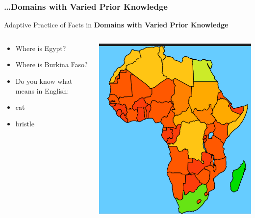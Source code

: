\documentclass[xcolor=svgnames]{beamer}
\begin{document}
\begin{frame}
	\frametitle{\ldots Domains with Varied Prior Knowledge}
       Adaptive Practice of Facts in \textbf{Domains with Varied Prior Knowledge}
  \begin{columns}
   \begin{column}{.49\textwidth}
      \begin{itemize}
        \item Where is Egypt?
        \item Where is Burkina Faso?
        \item Do you know what means in English:
        \item cat
        \item bristle
        \
      \end{itemize}
    \end{column}
    \begin{column}{.49\textwidth}
       \includegraphics[width=\textwidth]{img/knowledge-map.png}
    \end{column}
  \end{columns}
\end{frame}
\end{document}
